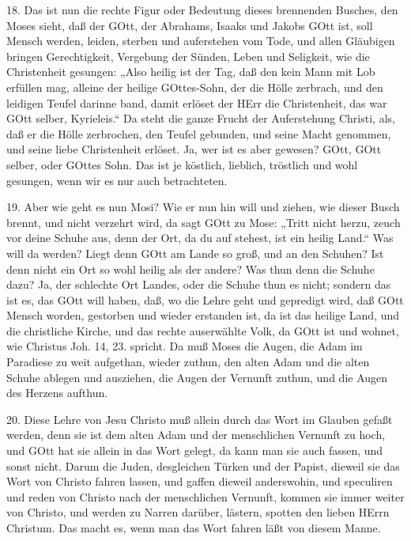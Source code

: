 18. Das ist nun die rechte Figur oder Bedeutung dieses brennenden Busches, den Moses sieht, daß der GOtt, der Abrahams, Isaaks und Jakobs GOtt ist, soll Mensch werden, leiden, sterben und auferstehen vom Tode, und allen Gläubigen bringen Gerechtigkeit, Vergebung der Sünden, Leben und Seligkeit, wie die Christenheit gesungen: „Also heilig ist der Tag, daß den kein Mann mit Lob erfüllen mag, alleine
der heilige GOttes-Sohn, der die Hölle zerbrach, und den leidigen Teufel darinne band, damit erlöset der HErr die Christenheit, das war GOtt selber, Kyrieleis.“ Da steht die ganze Frucht der Auferstehung Christi, als, daß er die Hölle zerbrochen, den Teufel gebunden, und seine Macht genommen, und seine liebe Christenheit erlöset. Ja, wer ist es aber gewesen? GOtt, GOtt selber, oder GOttes Sohn. Das ist je köstlich, lieblich, tröstlich und wohl gesungen, wenn wir es nur auch betrachteten.

19. Aber wie geht es nun Mosi? Wie er nun hin will und ziehen, wie dieser Busch brennt, und nicht verzehrt wird, da sagt GOtt zu Mose: „Tritt nicht herzu, zeuch vor deine Schuhe aus, denn der Ort, da du auf stehest, ist ein heilig Land.“ Was will da werden? Liegt denn GOtt am Lande so groß, und an den Schuhen? Ist denn nicht ein Ort so wohl heilig als der andere? Was thun denn die Schuhe dazu? Ja, der schlechte Ort Landes, oder die Schuhe thun es nicht; sondern das ist es, das GOtt will haben, daß, wo die Lehre geht und gepredigt wird, daß GOtt Mensch worden, gestorben und wieder erstanden ist, da ist das heilige Land, und die christliche Kirche, und das rechte auserwählte Volk, da GOtt ist und wohnet, wie Christus Joh. 14, 23. spricht. Da muß Moses die Augen, die Adam im Paradiese zu weit aufgethan, wieder zuthun, den alten Adam und die alten Schuhe ablegen und ausziehen, die Augen der Vernunft zuthun, und die Augen des Herzens aufthun.

20. Diese Lehre von Jesu Christo muß allein durch das Wort im Glauben gefaßt werden, denn sie ist dem alten Adam und der menschlichen Vernunft zu hoch, und GOtt hat sie allein in das Wort gelegt, da kann man sie auch fassen, und sonst nicht. Darum die Juden, desgleichen Türken und der Papist, dieweil sie das Wort von Christo fahren lassen, und gaffen dieweil anderswohin, und speculiren und reden von Christo nach der menschlichen Vernunft, kommen sie immer weiter von Christo, und werden zu Narren darüber, lästern, spotten den lieben HErrn Christum. Das macht es, wenn man das Wort fahren läßt von diesem Manne.

